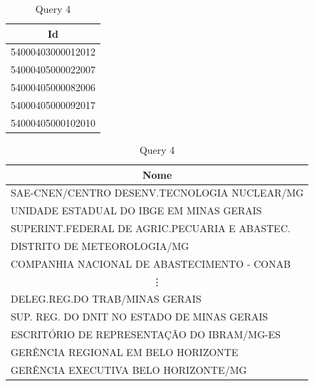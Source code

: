 \documentclass{article}
\begin{document}
\begin{table}[H]
  \begin{minipage}{.2\linewidth}
    \centering
    \begin{tabular}{c}
      Id \\
      \midrule
      54000403000012012 \\
      54000405000022007 \\
      54000405000082006 \\
      54000405000092017 \\
      54000405000102010 \\
      \bottomrule
    \end{tabular}
    \caption*{Query 5}
  \end{minipage}
  \begin{minipage}{.8\linewidth}
    \centering
    \begin{tabular}{l}
      \multicolumn{1}{c}{Nome} \\
      \midrule
      SAE-CNEN/CENTRO DESENV.TECNOLOGIA NUCLEAR/MG \\
      UNIDADE ESTADUAL DO IBGE EM MINAS GERAIS \\
      SUPERINT.FEDERAL DE AGRIC.PECUARIA E ABASTEC. \\
      DISTRITO DE METEOROLOGIA/MG \\
      COMPANHIA NACIONAL DE ABASTECIMENTO - CONAB \\
      \multicolumn{1}{c}{\vdots} \\
      DELEG.REG.DO TRAB/MINAS GERAIS \\
      SUP. REG. DO DNIT NO ESTADO DE MINAS GERAIS \\
      ESCRITÓRIO DE REPRESENTAÇÃO DO IBRAM/MG-ES \\
      GERÊNCIA REGIONAL EM BELO HORIZONTE \\
      GERÊNCIA EXECUTIVA BELO HORIZONTE/MG \\
      \bottomrule
    \end{tabular}
    \caption*{Query 4}
  \end{minipage}
\end{table}
\end{document}
